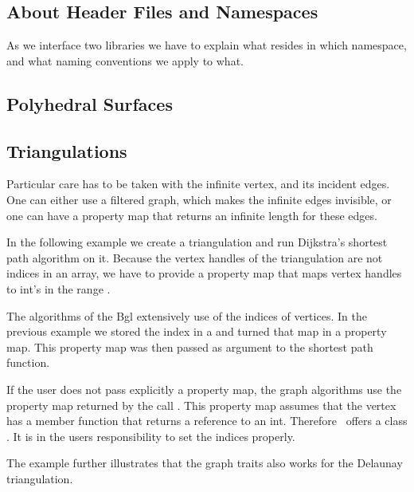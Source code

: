 \subsection{About Header Files and Namespaces}

As we interface two libraries we have to explain what resides in which namespace,
and what naming conventions we apply to what. 

\subsection{Polyhedral Surfaces}


\subsection{Triangulations}


Particular care has to be taken with the infinite vertex, and its incident
edges. One can either use a filtered graph, which makes the infinite edges
invisible, or one can have a property map that returns an infinite length
for these edges.




In the following example we create a triangulation and run Dijkstra's shortest path
algorithm on it. Because the vertex handles of the triangulation are not indices
in an array, we have to provide a property map that maps vertex handles to
int's in the range \ccc{[0, t.number_of_vertices())}.




The algorithms of the {\sc Bgl} extensively use of the indices of
vertices. In the previous example we stored the index in a 
and turned that map in a property map. This property map was then
passed as argument to the shortest path function.

If the user does not pass explicitly a property map, the graph algorithms
use the property map returned by the call .
This property map assumes that the vertex has a 
member function  that returns a reference to an int.
Therefore \cgal\ offers a class .
It is in the users responsibility to set the indices properly.

The example further illustrates that the graph traits also works
for the Delaunay triangulation.

